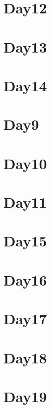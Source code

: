 
\section*{Day12}

\vfill
\section*{Day13}

\vfill
\section*{Day14}

\vfill
\section*{Day9}

\vfill
\section*{Day10}

\vfill
\section*{Day11}

\vfill
\section*{Day15}

\vfill
\section*{Day16}

\vfill
\section*{Day17}

\vfill
\section*{Day18}

\vfill
\section*{Day19}

\vfill
